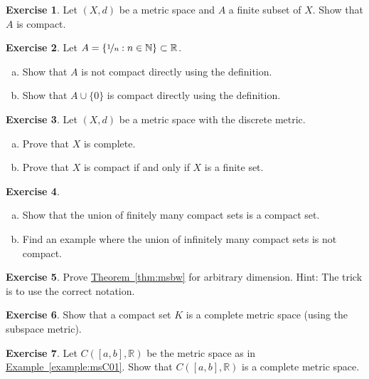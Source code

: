 \documentclass[12pt,openany]{book}
\newcommand{\R}{{\mathbb{R}}}
\newcommand{\N}{{\mathbb{N}}}
\theoremstyle{plain}
\theoremstyle{remark}
\theoremstyle{definition}
\newenvironment{exbox}{%
    \def\FrameCommand{\vrule width 1pt \relax\hspace {10pt}}%
    \MakeFramed {\advance \hsize -\width \FrameRestore }%
}{%
    \endMakeFramed
}
\newenvironment{exparts}{%
    \leavevmode\begin{enumerate}[a),noitemsep,topsep=0pt,parsep=0pt,partopsep=0pt]
}{%
    \end{enumerate}
}
\theoremstyle{exercise}
\newtheorem{exercise}{Exercise}[section]
\theoremstyle{example}
\newcommand{\exampleref}[1]{\hyperref[#1]{Example~\ref*{#1}}}
\newcommand{\thmref}[1]{\hyperref[#1]{Theorem~\ref*{#1}}}
\begin{document}
\begin{exbox}
\begin{exercise}
Let $(X,d)$ be a metric space and $A$ a finite subset of $X$.
Show that $A$ is compact.
\end{exercise}

\begin{samepage}
\begin{exercise}
Let $A = \{ \nicefrac{1}{n} : n \in \N \} \subset \R$.
\begin{exparts}
\item
Show that $A$ is
not compact directly using the definition.
\item
Show that $A \cup \{ 0 \}$ is
compact directly using the definition.
\end{exparts}
\end{exercise}
\end{samepage}


\begin{exercise}
Let $(X,d)$ be a metric space with the discrete metric.
\begin{exparts}
\item
Prove that $X$ is complete.
\item
Prove that $X$ is compact if and only if $X$ is a finite set.
\end{exparts}
\end{exercise}

\begin{exercise}
\begin{exparts}
\item
Show that the union of finitely many compact sets is a compact set.
\item
Find an example where the union of infinitely many compact sets is not
compact.
\end{exparts}
\end{exercise}

\begin{exercise}
Prove \thmref{thm:msbw} for arbitrary dimension.
Hint: The trick is to use the correct notation.
\end{exercise}

\begin{exercise}
Show that a compact set $K$ is a complete metric space (using the subspace
metric).
\end{exercise}

\begin{exercise} \label{exercise:CabRcomplete}
Let $C([a,b],\R)$ be the metric space as in \exampleref{example:msC01}.  Show that
$C([a,b],\R)$ is a complete metric space.
\end{exercise}


\end{exbox}
\end{document}
